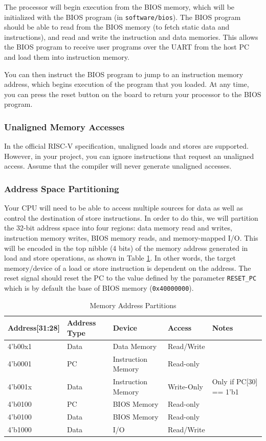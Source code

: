 \documentclass[11pt]{article}
\begin{document}
The processor will begin execution from the BIOS memory, which will be initialized with the BIOS program (in \verb|software/bios|).
The BIOS program should be able to read from the BIOS memory (to fetch static data and instructions), and read and write the instruction and data memories.
This allows the BIOS program to receive user programs over the UART from the host PC and load them into instruction memory.

You can then instruct the BIOS program to jump to an instruction memory address, which begins execution of the program that you loaded.
At any time, you can press the reset button on the board to return your processor to the BIOS program.

\subsubsection{Unaligned Memory Accesses}
In the official RISC-V specification, unaligned loads and stores are supported.
However, in your project, you can ignore instructions that request an unaligned access.
Assume that the compiler will never generate unaligned accesses.

\subsubsection{Address Space Partitioning}
Your CPU will need to be able to access multiple sources for data as well as control the destination of store instructions.
In order to do this, we will partition the 32-bit address space into four regions: data memory read and writes, instruction memory writes, BIOS memory reads, and memory-mapped I/O.
This will be encoded in the top nibble (4 bits) of the memory address generated in load and store operations, as shown in Table \ref{mem_space1}.
In other words, the target memory/device of a load or store instruction is dependent on the address.
The reset signal should reset the PC to the value defined by the parameter \verb|RESET_PC| which is by default the base of BIOS memory (\verb|0x40000000|).

\begin{table}[hbt]
  \begin{center}
    \caption{Memory Address Partitions}
    \label{mem_space1}
    \begin{tabular}{l l l l l}
      \bottomrule
      \textbf{Address[31:28]} & \textbf{Address Type} & \textbf{Device} & \textbf{Access} & \textbf{Notes} \\
      \midrule
      4'b00x1 & Data & Data Memory & Read/Write &\\
      4'b0001 & PC  &  Instruction Memory & Read-only &\\
      4'b001x & Data & Instruction Memory & Write-Only & Only if PC[30] == 1'b1\\
      4'b0100 & PC  & BIOS Memory & Read-only &\\
      4'b0100 & Data & BIOS Memory & Read-only &\\
      4'b1000 & Data & I/O & Read/Write &\\
      \bottomrule
    \end{tabular}
  \end{center}
\end{table}
\end{document}

